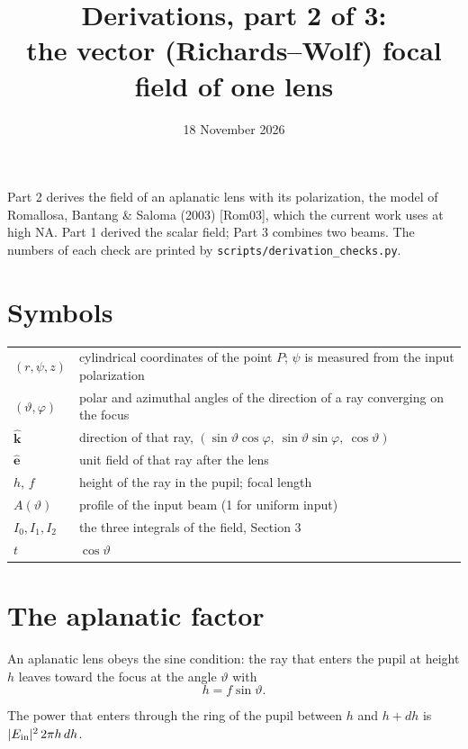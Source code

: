 \documentclass[11pt]{article}
\title{Derivations, part 2 of 3:\\ the vector (Richards--Wolf) focal field of one lens}
\date{18 November 2026}
\author{}
\begin{document}
\maketitle
\vspace{-2.5em}

Part 2 derives the field of an aplanatic lens with its polarization, the model of Romallosa, Bantang \& Saloma
(2003) [Rom03], which the current work uses at high NA. Part 1 derived the scalar field; Part 3 combines two beams.
The numbers of each check are printed by \texttt{scripts/derivation\_checks.py}.

\section*{Symbols}
\begin{center}\small\begin{tabular}{ll}\toprule
$(r, \psi, z)$ & cylindrical coordinates of the point $P$; $\psi$ is measured from the input polarization\\
$(\vartheta, \varphi)$ & polar and azimuthal angles of the direction of a ray converging on the focus\\
$\hat{\mathbf k}$ & direction of that ray, $(\sin\vartheta\cos\varphi,\ \sin\vartheta\sin\varphi,\ \cos\vartheta)$\\
$\hat{\mathbf e}$ & unit field of that ray after the lens\\
$h$, $f$ & height of the ray in the pupil; focal length\\
$A(\vartheta)$ & profile of the input beam (1 for uniform input)\\
$I_0, I_1, I_2$ & the three integrals of the field, Section 3\\
$t$ & $\cos\vartheta$\\\bottomrule
\end{tabular}\end{center}

\section{The aplanatic factor}
 An aplanatic lens obeys the sine condition: the ray that enters the pupil at height $h$ leaves toward the
focus at the angle $\vartheta$ with
\begin{equation}h = f\sin\vartheta .\end{equation}

 The power that enters through the ring of the pupil between $h$ and $h + dh$ is
$|E_{\rm in}|^2\,2\pi h\,dh$.
\end{document}
